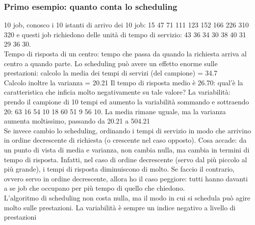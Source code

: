 \documentclass{article}
\begin{document}
\subsubsection{Primo esempio: quanto conta lo scheduling}
10 job, conosco i 10 istanti di arrivo dei 10 job: 15 47 71 111 123 152 166 226 310 320 e questi job richiedono delle unità di tempo di servizio: 43 36 34 30 38 40 31 29 36 30.\\ Tempo di risposta di un centro: tempo che passa da quando la richiesta arriva al centro a quando parte. Lo scheduling può avere un effetto enorme sulle prestazioni: calcolo la media dei tempi di servizi (del campione) = 34.7\\ Calcolo inoltre la varianza = 20.21 Il tempo di risposta medio è 26.70: qual'è la caratteristica che inficia molto negativamente su tale valore? La variabilità: prendo il campione di 10 tempi ed aumento la variabilità sommando e sottraendo 20: 63 16 54 10 18 60 51 9 56 10. La media rimane uguale, ma la varianza aumenta moltissimo, passando da 20.21 a 504.21\\ Se invece cambio lo scheduling, ordinando i tempi di servizio in modo che arrivino in ordine decrescente di richiesta (o crescente nel caso opposto). Cosa accade: da un punto di vista di media e varianza, non cambia nulla, ma cambia in termini di tempo di risposta. Infatti, nel caso di ordine decrescente (servo dal più piccolo al più grande), i tempi di risposta diminuiscono di molto. Se faccio il contrario, ovvero servo in ordine decrescente, allora ho il caso peggiore: tutti hanno davanti a se job che occupano per più tempo di quello che chiedono.\\ L'algoritmo di scheduling non costa nulla, ma il modo in cui si schedula può agire molto sulle prestazioni. La variabilità è sempre un indice negativo a livello di prestazioni
\end{document}
